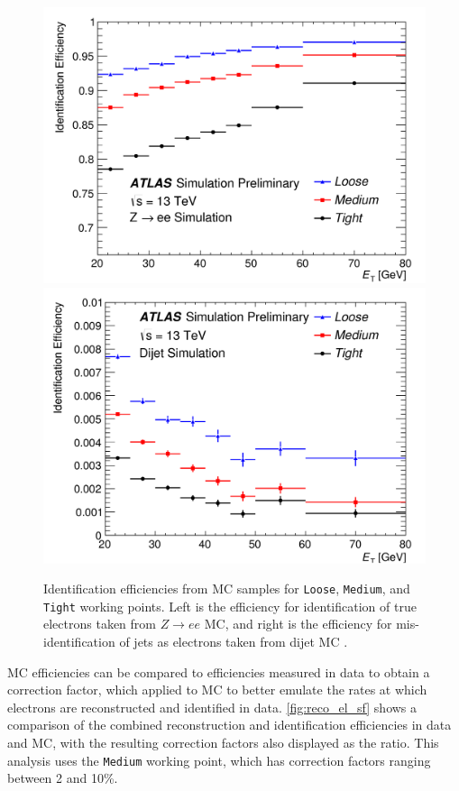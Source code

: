 \begin{centering}
\begin{figure}[!hbt]
\myfloatalign
\includegraphics[width=.48\linewidth]{figures/reco/fig_01a.png}
\includegraphics[width=.48\linewidth]{figures/reco/fig_01b.png}
\caption{ Identification efficiencies from \ac{MC} samples for \texttt{Loose}, \texttt{Medium}, and \texttt{Tight} working points. Left is the efficiency for identification of true electrons taken from $Z\rightarrow ee$ \ac{MC}, and right is the efficiency for mis-identification of jets as electrons taken from dijet \ac{MC} \cite{ATLAS-CONF-2016-024}.}
\label{fig:reco_el_eff}
\end{figure}
\end{centering}

\ac{MC} efficiencies can be compared to efficiencies measured in data to obtain a correction factor, which applied to \ac{MC} to better emulate the rates at which electrons are reconstructed and identified in data. \autoref{fig:reco_el_sf} shows a comparison of the combined reconstruction and identification efficiencies in data and \ac{MC}, with the resulting correction factors also displayed as the ratio. This analysis uses the \texttt{Medium} working point, which has correction factors ranging between 2 and 10\%. 

